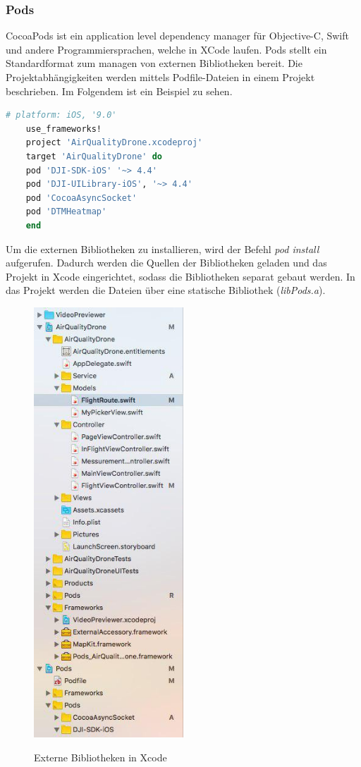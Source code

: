 \subsubsection{Pods}
CocoaPods ist ein application level dependency manager für Objective-C, Swift und andere Programmiersprachen, welche in XCode laufen. Pods stellt ein Standardformat zum managen von externen Bibliotheken bereit.
\newline
Die Projektabhängigkeiten werden mittels Podfile-Dateien in einem Projekt beschrieben. Im Folgendem ist ein Beispiel zu sehen.
\newline
\begin{lstlisting}[language=ruby, caption={Podfile Beispiel}]
	# platform: iOS, '9.0'
	use_frameworks!
	project 'AirQualityDrone.xcodeproj'
	target 'AirQualityDrone' do
	pod 'DJI-SDK-iOS' '~> 4.4'
	pod 'DJI-UILibrary-iOS', '~> 4.4'
	pod 'CocoaAsyncSocket'
	pod 'DTMHeatmap'
	end
\end{lstlisting}
Um die externen Bibliotheken zu installieren, wird der Befehl \textit{pod install} aufgerufen. Dadurch werden die Quellen der Bibliotheken geladen und das Projekt in Xcode eingerichtet, sodass die Bibliotheken separat gebaut werden. In das Projekt werden die Dateien über eine statische Bibliothek (\textit{libPods.a}).
\begin{figure}[H]
	\begin{center}
		{\includegraphics[width=0.5\textwidth]{images/pods.jpg}}
		\caption{Externe Bibliotheken in Xcode}
	\end{center}
\end{figure}

